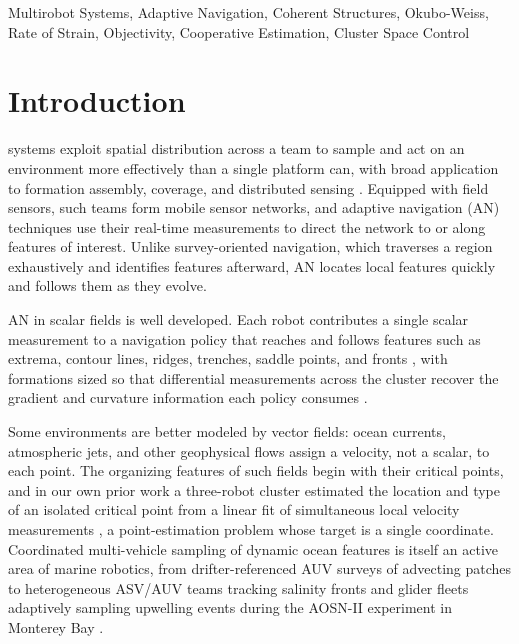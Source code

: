 \documentclass[lettersize,journal]{IEEEtran}
\begin{document}
\begin{IEEEkeywords}
Multirobot Systems, Adaptive Navigation, Coherent Structures,
Okubo-Weiss, Rate of Strain, Objectivity, Cooperative
Estimation, Cluster Space Control
\end{IEEEkeywords}


\section{Introduction}
\label{sec:intro}

 systems exploit spatial distribution across a team to sample
and act on an environment more effectively than a single platform can,
with broad application to formation assembly, coverage, and distributed
sensing \cite{1}. Equipped with field sensors, such teams form mobile
sensor networks, and adaptive navigation (AN) techniques use their
real-time measurements to direct the network to or along features of
interest. Unlike survey-oriented navigation, which traverses a region
exhaustively and identifies features afterward, AN locates local
features quickly and follows them as they evolve.

AN in scalar fields is well developed. Each robot contributes a single
scalar measurement to a navigation policy that reaches and follows
features such as extrema, contour lines, ridges, trenches, saddle
points, and fronts \cite{26,27,28,29}, with formations sized so that
differential measurements across the cluster recover the gradient and
curvature information each policy consumes \cite{15,26}.

Some environments are better modeled by vector fields: ocean currents,
atmospheric jets, and other geophysical flows assign a velocity, not a
scalar, to each point. The organizing features of such fields begin
with their critical points, and in our own prior work a three-robot
cluster estimated the location and type of an isolated critical point
from a linear fit of simultaneous local velocity measurements
\cite{14}, a point-estimation problem whose target is a single
coordinate. Coordinated multi-vehicle sampling of dynamic ocean
features is itself an active area of marine robotics, from
drifter-referenced AUV surveys of advecting patches \cite{2} to
heterogeneous ASV/AUV teams tracking salinity fronts \cite{3} and
glider fleets adaptively sampling upwelling events during the AOSN-II
experiment in Monterey Bay \cite{4}.
\end{document}
